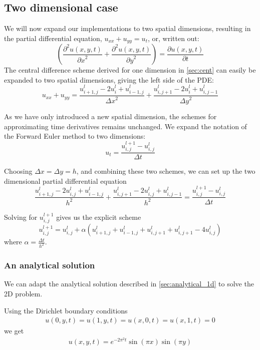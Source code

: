 \documentclass[10pt,a4paper]{article}
\newcommand{\dt}{{\Delta t}}
\newcommand{\dx}{{\Delta x}}
\newcommand{\dy}{{\Delta y}}
\newcommand{\pt}{{\partial t}}
\newcommand{\px}{{\partial x}}
\newcommand{\py}{{\partial y}}
\newcommand{\pu}{{\partial u}}
\newcommand{\ppu}{{\partial^2 u}}
\begin{document}
\subsection{Two dimensional case}
We will now expand our implementations to two spatial dimensions, resulting in the partial differential equation, $u_{xx} + u_{yy} = u_t$, or, written out:
\begin{equation}
\left(\frac{\ppu(x,y,t)}{\px^2} + \frac{\ppu(x,y,t)}{\py^2}\right) = \frac{\pu(x,y,t)}{\pt}
\label{eq:diffusion_2d}
\end{equation}
The central difference scheme derived for one dimension in \ref{sec:cent} can easily be expanded to two spatial dimensions, giving the left side of the PDE:
\begin{equation}
u_{xx} + u_{yy} = \frac{u_{i+1,j}^l - 2u_i^l+u_{i-1,j}^l}{\dx^2} + \frac{u_{i,j+1}^l - 2u_i^l+u_{i,j-1}^l}{\dy^2}
\end{equation}

As we have only introduced a new spatial dimension, the schemes for approximating time derivatives remains unchanged. We expand the notation of the Forward Euler method to two dimensions:
\begin{equation}
u_t = \frac{u_{i,j}^{l+1} - u_{i,j}^l}{\dt}
\end{equation}

Choosing $\dx = \dy = h$, and combining these two schemes, we can set up the two dimensional partial differential equation
\begin{equation}
\frac{u_{i+1,j}^l - 2u_{i,j}^l + u_{i-1,j}^l}{h^2} + \frac{u_{i,j+1}^l - 2u_{i,j}^l + u_{i,j-1}^l}{h^2} = \frac{u_{i,j}^{l+1} - u_{i,j}^l}{\dt}
\end{equation}

Solving for $u_{i,j}^{l+1}$ gives us the explicit scheme
\begin{equation}
u_{i,j}^{l+1} = u_{i,j}^l + \alpha\left( u_{i+1,j}^l + u_{i-1,j}^l + u_{i,j+1}^l + u_{i,j+1}^l - 4u_{i,j}^l \right)
\end{equation}
where $\alpha = \frac{\dt}{h^2}$.
\subsubsection{An analytical solution}
We can adapt the analytical solution described in \vref{sec:analytical_1d} to solve the 2D problem.

Using the Dirichlet boundary conditions
\begin{align}
u(0, y, t) = u(1, y, t) = u(x, 0, t) = u(x, 1, t) = 0
\end{align}
we get
\begin{align}\label{eq:analytical_2d}
    u(x, y, t) = e^{-2\pi^2 t} \sin(\pi x) \sin(\pi y)
\end{align}
\end{document}
